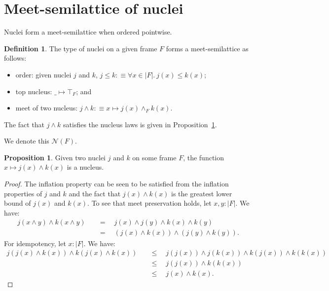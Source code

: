 \documentclass[a4paper, 11pt]{article}
\theoremstyle{definition}
\newtheorem{prop}{Proposition}
\newtheorem{defn}{Definition}
\begin{document}
\section{Meet-semilattice of nuclei}

Nuclei form a meet-semilattice when ordered pointwise.

\begin{defn}\label{defn:nuclei-semilattice}
  The type of nuclei on a given frame $F$ forms a meet-semilattice as follows:
  \begin{itemize}
    \item order: given nuclei $j$ and $k$, $j \le k :\equiv \forall x \in | F |.\ j(x) \le k(x)$;
    \item top nucleus: $\_ \mapsto \top_F$; and
    \item meet of two nucleus: $j \wedge k :\equiv x \mapsto j(x) \wedge_F k(x)$.
  \end{itemize}
  The fact that $j \wedge k$ satisfies the nucleus laws is given in Proposition~\ref{prop:nuclei-meet}.
\end{defn}

We denote this $\mathcal{N}(F)$.

\begin{prop}\label{prop:nuclei-meet}
  Given two nuclei $j$ and $k$ on some frame $F$, the function $x \mapsto j(x) \wedge k(x)$ is a nucleus.
\end{prop}
\begin{proof}
  The inflation property can be seen to be satisfied from the inflation properties of $j$ and $k$
  and the fact that $j(x) \wedge k(x)$ is the greatest lower bound of $j(x)$ and $k(x)$. To see that meet
  preservation holds, let $x, y : | F |$. We have:
  \begin{align*}
    j (x \wedge y) \wedge k (x \wedge y) &\quad=\quad j(x) \wedge j(y) \wedge k(x) \wedge k(y) \\
                          &\quad=\quad (j(x) \wedge k(x)) \wedge (j(y) \wedge k(y)).
  \end{align*}
  For idempotency, let $x : | F |$. We have:
  \begin{align*}
    j (j(x) \wedge k(x)) \wedge k(j(x) \wedge k(x)) &\quad\le\quad j(j(x)) \wedge j(k(x)) \wedge k(j(x)) \wedge k(k(x)) \\
                                     &\quad\le\quad j(j(x)) \wedge k(k(x)) & \\
                                     &\quad\le\quad j(x) \wedge k(x).
  \end{align*}
\end{proof}
\end{document}

